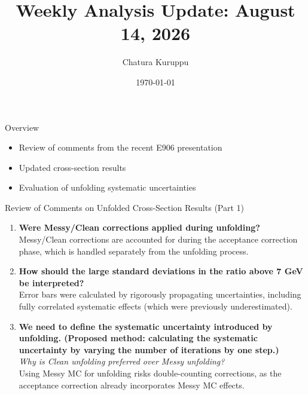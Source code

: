 \documentclass[aspectratio=169]{beamer}
\title{Weekly Analysis Update: August 14, 2026}
\author{Chatura Kuruppu}
\institute{New Mexico State University\\ \vspace{0.1cm} SeaQuest Experiment (E906)}
\date{\today}
\begin{document}
\begin{frame}
    \titlepage
\end{frame}

\begin{frame}{Overview}
    \begin{itemize}
        \setlength\itemsep{1em}
        \item Review of comments from the recent E906 presentation
        \item Updated cross-section results
        \item Evaluation of unfolding systematic uncertainties
    \end{itemize}
\end{frame}

\begin{frame}{Review of Comments on Unfolded Cross-Section Results (Part 1)}
    \begin{enumerate}
        \item \textbf{Were Messy/Clean corrections applied during unfolding?} \\
        Messy/Clean corrections are accounted for during the acceptance correction phase, which is handled separately from the unfolding process.
        
        \vspace{0.3cm}
        \item \textbf{How should the large standard deviations in the ratio above 7 GeV be interpreted?} \\
        Error bars were calculated by rigorously propagating uncertainties, including fully correlated systematic effects (which were previously underestimated).
        
        \vspace{0.3cm}
        \item \textbf{We need to define the systematic uncertainty introduced by unfolding. (Proposed method: calculating the systematic uncertainty by varying the number of iterations by one step.)} \\
        \textit{Why is Clean unfolding preferred over Messy unfolding?} \\
        Using Messy MC for unfolding risks double-counting corrections, as the acceptance correction already incorporates Messy MC effects.
    \end{enumerate}
\end{frame}
\end{document}
